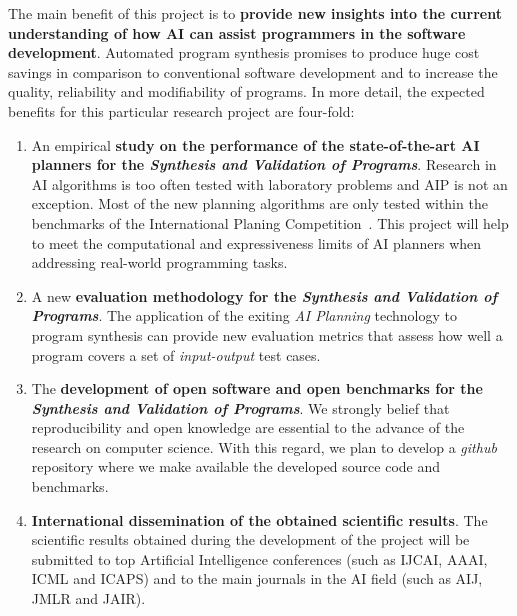 \documentclass[10pt,a4paper]{paper}
\begin{document}
The main benefit of this project is to {\bf provide new insights into the current understanding of how AI can assist programmers in the software development}.  Automated program synthesis promises to produce huge cost savings in comparison to conventional software development and to increase the quality, reliability and modifiability of programs.  In more detail, the expected benefits for this particular research project are four-fold:
\begin{enumerate}
\item An empirical {\bf study on the performance of the state-of-the-art AI planners for the {\em Synthesis and Validation of Programs}}. Research in AI algorithms is too often tested with laboratory problems and AIP is not an exception. Most of the new planning algorithms are only tested within the benchmarks of the International Planing Competition~\cite{vallati:IPC:AI15}. This project will help to meet the computational and expressiveness limits of AI planners when addressing real-world programming tasks. 
\item A new {\bf evaluation methodology for the {\em Synthesis and Validation of Programs}}. The application of the exiting {\em AI Planning} technology to program synthesis can provide new evaluation metrics that assess how well a program covers a set of {\em input-output} test cases.  
\item The {\bf development of open software and open benchmarks for the {\em Synthesis and Validation of Programs}}. We strongly belief that reproducibility and open knowledge are essential to the advance of the research on computer science. With this regard, we plan to develop a {\em github} repository where we make available the developed source code and benchmarks.
\item {\bf International dissemination of the obtained scientific results}. The scientific results obtained during the development of the project will be submitted to top Artificial Intelligence conferences (such as IJCAI, AAAI, ICML and ICAPS) and to the main journals in the AI field (such as AIJ, JMLR and JAIR).
\end{enumerate}

\vspace{0.3cm}


\begin{scriptsize}

\end{scriptsize}

\end{document}
